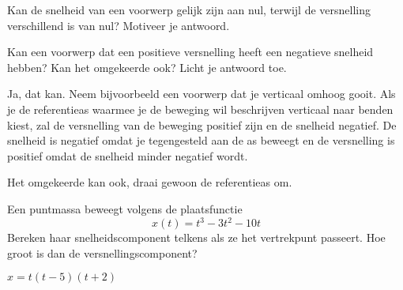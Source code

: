 \documentclass{ximera}
\begin{document}
	\author{Bart Lambregs}
    \xmsource\xmuitleg




\begin{exercise}
Kan de snelheid van een voorwerp gelijk zijn aan nul, terwijl de versnelling verschillend is van nul? Motiveer je antwoord.
\end{exercise}


\begin{exercise}
Kan een voorwerp dat een positieve versnelling heeft een negatieve snelheid hebben? Kan het omgekeerde ook? Licht je antwoord toe.

\begin{oplossing}
    Ja, dat kan. Neem bijvoorbeeld een voorwerp dat je verticaal omhoog gooit. Als je de referentieas waarmee je de beweging wil beschrijven verticaal naar benden kiest, zal de versnelling van de beweging positief zijn en de snelheid negatief. De snelheid is negatief omdat je tegengesteld aan de as beweegt en de versnelling is positief omdat de snelheid minder negatief wordt.

    Het omgekeerde kan ook, draai gewoon de referentieas om.
\end{oplossing}
\end{exercise}

\begin{exercise}
	Een puntmassa beweegt volgens de plaatsfunctie
	\[
	x(t)=t^3-3t^2-10t
	\]
	Bereken haar snelheidscomponent telkens als ze het vertrekpunt passeert. Hoe groot is dan de versnellingscomponent?
	\begin{oplossing}
		$x=t(t-5)(t+2)$
	\end{oplossing}
\end{exercise}
\end{document}

